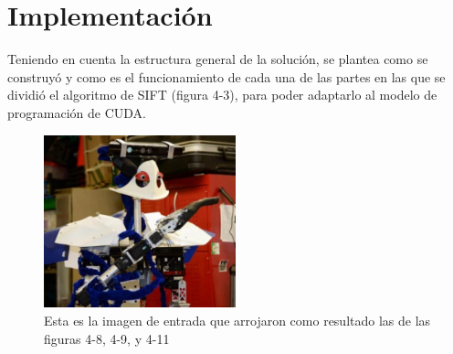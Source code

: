 \section{Implementación}
Teniendo en cuenta la estructura general de la solución, se plantea como se construyó y como es el funcionamiento de cada una de las partes en las que se dividió el algoritmo de SIFT (figura 4-3), para poder adaptarlo al modelo de programación de CUDA.
\begin{figure}[H]
		\centering
		\includegraphics[height=5cm]{img/justina.jpg}
		\caption{Esta es la imagen de entrada que arrojaron como resultado las de las figuras 4-8, 4-9, y 4-11}
\end{figure}
